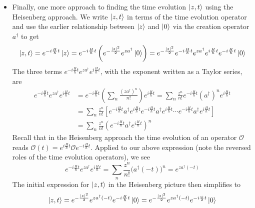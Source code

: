 \documentclass[11pt, a4paper]{article}
\newcommand{\tev}{e^{-i\frac{H}{\hbar}t}}  %
\newcommand{\tevp}{e^{i\frac{H}{\hbar}t}}  %
\begin{document}
\begin{itemize}
	\item Finally, one more approach to finding the time evolution $ \ket{z, t} $ using the Heisenberg approach. We write $ \ket{z, t} $ in terms of the time evolution operator and use the earlier relationship between $ \ket{z} $ and $ \ket{0} $ via the creation operator $ a^{\dagger} $ to get
	\begin{equation*}
		\ket{z, t} = \tev \ket{z} = \tev\left( e^{-\frac{\abs{z}^{2}}{2}}e^{za^{\dagger}}\ket{0}\right) = e^{-\frac{\abs{z}^{2}}{2}}\tev e^{za^{\dagger}}\tevp \tev \ket{0}
	\end{equation*}
	The three terms $ \tev e^{za^{\dagger}} \tevp $, with the exponent written as a Taylor series, are
	\begin{align*}
		\tev e^{za^{\dagger}} \tevp &= \tev \left(\sum_{n}\frac{(za^{\dagger})^{n}}{n!}\right)\tevp = \sum_{n} \frac{z^{n}}{n!}\tev (a^{\dagger})^{n} \tevp\\
		&= \sum_{n}\frac{z^{n}}{n!}\left[\tev a^{\dagger}\tevp \tev a^{\dagger}\tevp \cdots \tev a^{\dagger}\tevp\right]\\
		&=\sum_{n}\frac{z^{n}}{n!}\left(\tev a^{\dagger}\tevp\right)^{n}
	\end{align*}
	Recall that in the Heisenberg approach the time evolution of an operator $ \mathcal{O} $ reads $  \mathcal{O}(t) = \tevp  \mathcal{O} \tev$. Applied to our above expression (note the reversed roles of the time evolution operators), we see
	\begin{equation*}
		\tev e^{za^{\dagger}} \tevp = \sum_{n}\frac{z^{n}}{n!}\big(a^{\dagger}(-t)\big)^{n} = e^{za^{\dagger}(-t)}
	\end{equation*}
	The initial expression for $ \ket{z, t} $ in the Heisenberg picture then simplifies to
	\begin{equation*}
		\ket{z, t} = e^{-\frac{\abs{z}^{2}}{2}}  e^{za^{\dagger}(-t)} \tev \ket{0} = e^{-\frac{\abs{z}^{2}}{2}}  e^{za^{\dagger}(-t)} e^{-i\frac{\omega}{2}t}\ket{0}
	\end{equation*}
	

\end{itemize}
\end{document}
